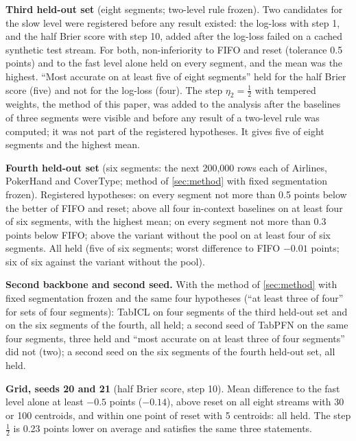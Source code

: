 \documentclass[11pt]{article}
\theoremstyle{plain}
\theoremstyle{definition}
\theoremstyle{remark}
\begin{document}
\textbf{Third held-out set} (eight segments; two-level rule frozen). Two candidates for the slow level were
registered before any result existed: the log-loss with step 1, and the half Brier score with step 10, added after
the log-loss failed on a cached synthetic test stream. For both, non-inferiority to FIFO and reset (tolerance 0.5
points) and to the fast level alone held on every segment, and the mean was the highest. ``Most accurate on at least
five of eight segments'' held for the half Brier score (five) and not for the log-loss (four). The step
$\eta_2=\tfrac12$ with tempered weights, the method of this paper, was added to the analysis after the baselines of
three segments were visible and before any result of a two-level rule was computed; it was not part of the
registered hypotheses. It gives five of eight segments and the highest mean.

\textbf{Fourth held-out set} (six segments: the next 200{,}000 rows each of Airlines, PokerHand and CoverType; method of
\cref{sec:method} with fixed segmentation frozen). Registered hypotheses: on every segment not more than 0.5 points below the better of FIFO
and reset; above all four in-context baselines on at least four of six segments, with the highest mean; on every
segment not more than 0.3 points below FIFO; above the variant without the pool on at least four of six segments.
All held (five of six segments; worst difference to FIFO $-0.01$ points; six of six against the variant without the
pool).

\textbf{Second backbone and second seed.} With the method of \cref{sec:method} with fixed segmentation frozen and the same four hypotheses
(``at least three of four'' for sets of four segments): TabICL on four segments of the third held-out set and on the
six segments of the fourth, all held; a second seed of TabPFN on the same four segments, three held and ``most accurate on at least three of four
segments'' did not (two); a second seed on the six segments of the fourth held-out set, all held.

\textbf{Grid, seeds 20 and 21} (half Brier score, step 10). Mean difference to the fast level alone at least $-0.5$
points ($-0.14$), above reset on all eight streams with 30 or 100 centroids, and within one point of reset with 5
centroids: all held. The step $\tfrac12$ is 0.23 points lower on average and satisfies the same three statements.
\end{document}

